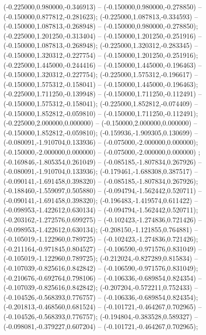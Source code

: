  (-0.225000,0.980000,-0.346913) -- (-0.150000,0.980000,-0.278850) -- (-0.150000,0.877812,-0.281623);
 (-0.225000,1.087813,-0.334593) -- (-0.150000,1.087813,-0.268948) -- (-0.150000,0.980000,-0.278850);
 (-0.225000,1.201250,-0.313404) -- (-0.150000,1.201250,-0.251916) -- (-0.150000,1.087813,-0.268948);
 (-0.225000,1.320312,-0.283345) -- (-0.150000,1.320312,-0.227754) -- (-0.150000,1.201250,-0.251916);
 (-0.225000,1.445000,-0.244416) -- (-0.150000,1.445000,-0.196463) -- (-0.150000,1.320312,-0.227754);
 (-0.225000,1.575312,-0.196617) -- (-0.150000,1.575312,-0.158041) -- (-0.150000,1.445000,-0.196463);
 (-0.225000,1.711250,-0.139948) -- (-0.150000,1.711250,-0.112491) -- (-0.150000,1.575312,-0.158041);
 (-0.225000,1.852812,-0.074409) -- (-0.150000,1.852812,-0.059810) -- (-0.150000,1.711250,-0.112491);
 (-0.225000,2.000000,0.000000) -- (-0.150000,2.000000,0.000000) -- (-0.150000,1.852812,-0.059810);
 (-0.159936,-1.909305,0.130699) -- (-0.080091,-1.910704,0.133936) -- (-0.075000,-2.000000,0.000000);
 (-0.150000,-2.000000,0.000000) -- (-0.075000,-2.000000,0.000000) ;
 (-0.169846,-1.805354,0.261049) -- (-0.085185,-1.807834,0.267926) -- (-0.080091,-1.910704,0.133936);
 (-0.179461,-1.688308,0.387517) -- (-0.090141,-1.691458,0.398320) -- (-0.085185,-1.807834,0.267926);
 (-0.188460,-1.559097,0.505880) -- (-0.094794,-1.562442,0.520711) -- (-0.090141,-1.691458,0.398320);
 (-0.196483,-1.419574,0.611422) -- (-0.098953,-1.422612,0.630134) -- (-0.094794,-1.562442,0.520711);
 (-0.203162,-1.272576,0.699275) -- (-0.102423,-1.274836,0.721426) -- (-0.098953,-1.422612,0.630134);
 (-0.208150,-1.121855,0.764881) -- (-0.105019,-1.122960,0.789725) -- (-0.102423,-1.274836,0.721426);
 (-0.211164,-0.971845,0.804527) -- (-0.106590,-0.971576,0.831049) -- (-0.105019,-1.122960,0.789725);
 (-0.212024,-0.827289,0.815834) -- (-0.107039,-0.825616,0.842842) -- (-0.106590,-0.971576,0.831049);
 (-0.210676,-0.692764,0.798106) -- (-0.106336,-0.689854,0.824354) -- (-0.107039,-0.825616,0.842842);
 (-0.207204,-0.572211,0.752433) -- (-0.104526,-0.568393,0.776757) -- (-0.106336,-0.689854,0.824354);
 (-0.201813,-0.468560,0.681524) -- (-0.101721,-0.464267,0.702965) -- (-0.104526,-0.568393,0.776757);
 (-0.194804,-0.383528,0.589327) -- (-0.098081,-0.379227,0.607204) -- (-0.101721,-0.464267,0.702965);

